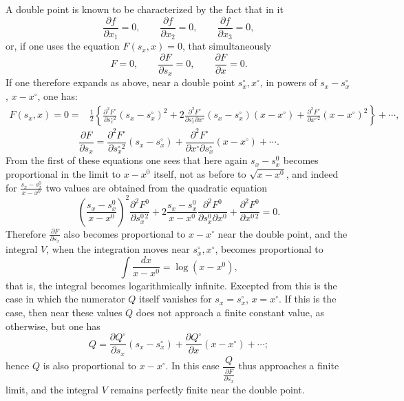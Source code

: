 \documentclass[10pt]{article}
\begin{document}
A double point is known to be characterized by the fact that in it
\[
\frac{\partial f}{\partial x_1}=0,
\qquad \frac{\partial f}{\partial x_2}=0,
\qquad \frac{\partial f}{\partial x_3}=0,
\]
or, if one uses the equation $F(s_x,x)=0$, that simultaneously
\[
F=0,\qquad \frac{\partial F}{\partial s_x}=0,\qquad \frac{\partial F}{\partial x}=0.
\]
If one therefore expands as above, near a double point $s_x^\circ,x^\circ$, in powers of $s_x-s_x^\circ$, $x-x^\circ$, one has:
\[
\begin{aligned}
F(s_x,x)=0={}&\frac12\left\{\frac{\partial^2F^\circ}{\partial s_x^{\circ\,2}}(s_x-s_x^\circ)^2
+2\frac{\partial^2F^\circ}{\partial s_x^\circ\partial x^\circ}(s_x-s_x^\circ)(x-x^\circ)
+\frac{\partial^2F^\circ}{\partial x^{\circ\,2}}(x-x^\circ)^2\right\}+\cdots,
\end{aligned}
\]
\[
\frac{\partial F}{\partial s_x}=\frac{\partial^2F^\circ}{\partial s_x^{\circ\,2}}(s_x-s_x^\circ)+\frac{\partial^2F^\circ}{\partial x^\circ\partial s_x^\circ}(x-x^\circ)+\cdots.
\]
From the first of these equations one sees that here again $s_x-s_x^0$ becomes proportional in the limit to $x-x^0$ itself, not as before to $\sqrt{x-x^0}$, and indeed for $\frac{s_x-s_x^0}{x-x^0}$ two values are obtained from the quadratic equation
\[
\left(\frac{s_x-s_x^0}{x-x^0}\right)^2\frac{\partial^2F^0}{\partial s_x^{0\,2}}
+2\frac{s_x-s_x^0}{x-x^0}\frac{\partial^2F^0}{\partial s_x^0\partial x^0}
+\frac{\partial^2F^0}{\partial x^{0\,2}}=0.
\]
Therefore $\frac{\partial F}{\partial s_x}$ also becomes proportional to $x-x^\circ$ near the double point, and the integral $V$, when the integration moves near $s_x^\circ,x^\circ$, becomes proportional to
\[
\int\frac{dx}{x-x^0}=\log(x-x^0),
\]
that is, the integral becomes logarithmically infinite. Excepted from this is the case in which the numerator $Q$ itself vanishes for $s_x=s_x^\circ$, $x=x^\circ$. If this is the case, then near these values $Q$ does not approach a finite constant value, as otherwise, but one has
\[
Q=\frac{\partial Q^\circ}{\partial s_x}(s_x-s_x^\circ)+\frac{\partial Q^\circ}{\partial x}(x-x^\circ)+\cdots;
\]
hence $Q$ is also proportional to $x-x^\circ$. In this case $\dfrac{Q}{\frac{\partial F}{\partial s_x}}$ thus approaches a finite limit, and the integral $V$ remains perfectly finite near the double point.
\end{document}
